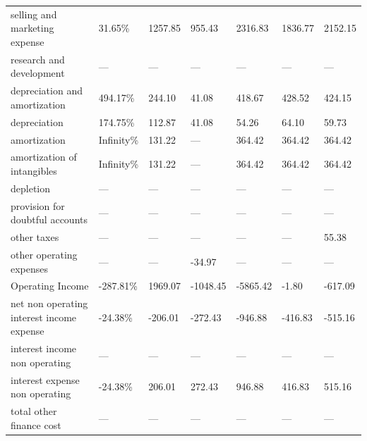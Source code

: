 \begin{table}[]
{\begin{tabular}{@{}lllllll@{}}
selling and marketing expense                                 & 31.65\%    & 1257.85   & 955.43    & 2316.83  & 1836.77  & 2152.15  \\
research and development                                      & —          & —         & —         & —        & —        & —        \\
depreciation and amortization                                 & 494.17\%   & 244.10    & 41.08     & 418.67   & 428.52   & 424.15   \\
depreciation                                                  & 174.75\%   & 112.87    & 41.08     & 54.26    & 64.10    & 59.73    \\
amortization                                                  & Infinity\% & 131.22    & —         & 364.42   & 364.42   & 364.42   \\
amortization of intangibles                                   & Infinity\% & 131.22    & —         & 364.42   & 364.42   & 364.42   \\
depletion                                                     & —          & —         & —         & —        & —        & —        \\
provision for doubtful accounts                               & —          & —         & —         & —        & —        & —        \\
other taxes                                                   & —          & —         & —         & —        & —        & 55.38    \\
other operating expenses                                      & —          & —         & -34.97    & —        & —        & —        \\
Operating Income                                              & -287.81\%  & 1969.07   & -1048.45  & -5865.42 & -1.80    & -617.09  \\
net non operating interest income expense                     & -24.38\%   & -206.01   & -272.43   & -946.88  & -416.83  & -515.16  \\
interest income non operating                                 & —          & —         & —         & —        & —        & —        \\
interest expense non operating                                & -24.38\%   & 206.01    & 272.43    & 946.88   & 416.83   & 515.16   \\
total other finance cost                                      & —          & —         & —         & —        & —        & —        \\

\end{tabular}}
\end{table}
